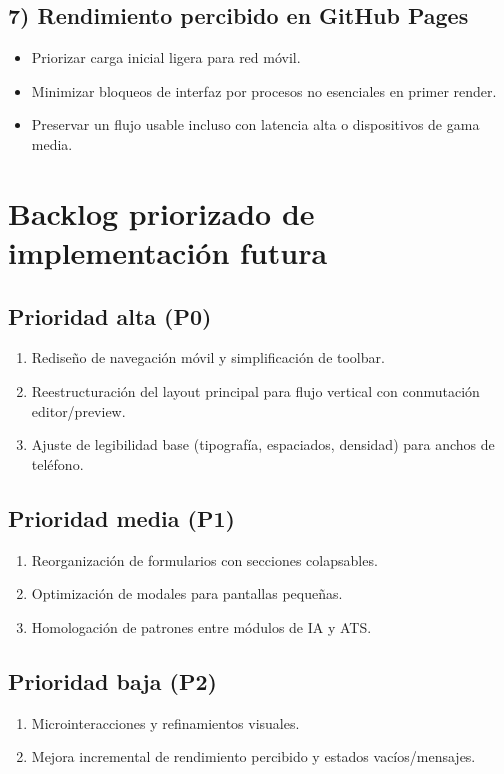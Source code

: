\documentclass[12pt,a4paper]{article}
\begin{document}
\subsection{7) Rendimiento percibido en GitHub Pages}
\begin{itemize}[leftmargin=1.2cm]
  \item Priorizar carga inicial ligera para red móvil.
  \item Minimizar bloqueos de interfaz por procesos no esenciales en primer render.
  \item Preservar un flujo usable incluso con latencia alta o dispositivos de gama media.
\end{itemize}

\section{Backlog priorizado de implementación futura}
\subsection{Prioridad alta (P0)}
\begin{enumerate}[leftmargin=1.2cm]
  \item Rediseño de navegación móvil y simplificación de toolbar.
  \item Reestructuración del layout principal para flujo vertical con conmutación editor/preview.
  \item Ajuste de legibilidad base (tipografía, espaciados, densidad) para anchos de teléfono.
\end{enumerate}

\subsection{Prioridad media (P1)}
\begin{enumerate}[leftmargin=1.2cm]
  \item Reorganización de formularios con secciones colapsables.
  \item Optimización de modales para pantallas pequeñas.
  \item Homologación de patrones entre módulos de IA y ATS.
\end{enumerate}

\subsection{Prioridad baja (P2)}
\begin{enumerate}[leftmargin=1.2cm]
  \item Microinteracciones y refinamientos visuales.
  \item Mejora incremental de rendimiento percibido y estados vacíos/mensajes.
\end{enumerate}
\end{document}
